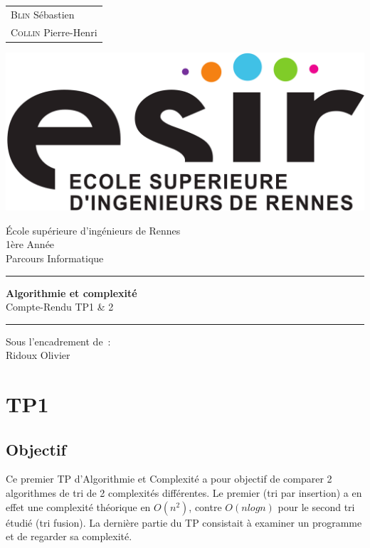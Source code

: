 \documentclass{article}
\begin{document}
\begin{titlepage}
	\vspace{-20px}
	\begin{tabular}{l}
		\textsc{Blin} S\'ebastien\\
		\textsc{Collin} Pierre-Henri
	\end{tabular}
	\hfill \vspace{10px}\includegraphics[scale=0.1]{esir.png}\\
	\vfill
	\begin{center}
		\Huge{\'Ecole sup\'erieure d'ing\'enieurs de Rennes}\\
		\vspace{1cm}
		\LARGE{1\`ere Ann\'ee}\\
		\large{Parcours Informatique}\\
		\vspace{0.5cm}\hrule\vspace{0.5cm}
		\LARGE{\textbf{Algorithmie et complexité}}\\
		\Large{Compte-Rendu TP1 \& 2}
		\vspace{0.5cm}\hrule
		\vfill
		\vfill
	\end{center}
	\begin{flushleft}
		\Large{Sous l'encadrement de~:}\\
		\vspace{0.2cm}
		\large{{Ridoux} Olivier}
	\end{flushleft}
	\vfill
\end{titlepage}

\section{TP1}
\subsection{Objectif}
Ce premier TP d'Algorithmie et Complexité a pour objectif de comparer 2 algorithmes de tri de 2 complexités différentes. Le premier (tri par insertion) a en effet une complexité théorique en $O(n^2)$, contre $O(nlogn)$ pour le second tri étudié (tri fusion). La dernière partie du TP consistait à examiner un programme et de regarder sa complexité.
\end{document}
